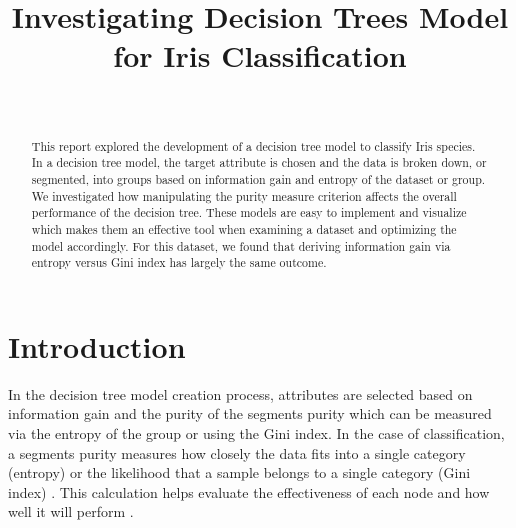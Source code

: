 \documentclass[journal]{IEEEtran}
\begin{document}
\setlength{\emergencystretch}{12pt}
\setlength{\parindent}{10pt}



\lstset{style=mystyle}

\title{Investigating Decision Trees Model for Iris Classification}

\author{
\\
}

\maketitle

\begin{abstract}
\label{log:abstract}
This report explored the development of a decision tree model to classify Iris species. In a decision tree model, the target attribute is chosen and the data is broken down, or segmented, into groups based on information gain and entropy of the dataset or group. We investigated how manipulating the purity measure criterion affects the overall performance of the decision tree. These models are easy to implement and visualize which makes them an effective tool when examining a dataset and optimizing the model accordingly. For this dataset, we found that deriving information gain via entropy versus Gini index has largely the same outcome.
\end{abstract}

\section{Introduction}

In the decision tree model creation process, attributes are selected based on information gain and the purity of the segments purity which can be measured via the entropy of the group or using the Gini index. In the case of classification, a segment\textquotesingle s purity measures how closely the data fits into a single category (entropy) or the likelihood that a sample belongs to a single category (Gini index) \cite{b2}. This calculation helps evaluate the effectiveness of each node and how well it will perform \cite{b1}. 
\end{document}
